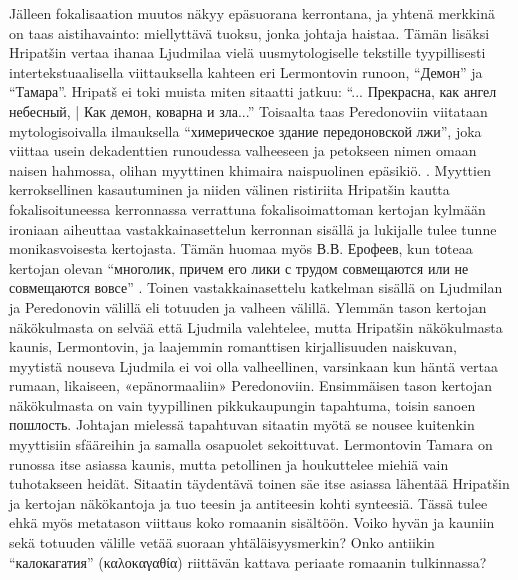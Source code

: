 \documentclass[12pt,a4paper]{article}
\begin{document}
Jälleen fokalisaation muutos näkyy epäsuorana kerrontana, ja yhtenä merkkinä on taas aistihavainto: miellyttävä tuoksu, jonka johtaja haistaa. %
Tämän lisäksi Hripatšin vertaa ihanaa Ljudmilaa vielä uusmytologiselle tekstille tyypillisesti intertekstuaalisella viittauksella kahteen eri Lermontovin runoon, \enquote{Демон} ja \enquote{Тамара}. Hripatš ei toki muista miten sitaatti jatkuu: \enquote{... Прекрасна, как ангел небесный, | Как демон, коварна и зла...} Toisaalta taas Peredonoviin viitataan mytologisoivalla ilmauksella \enquote{химерическое здание передоновской лжи}, joka viittaa usein dekadenttien runoudessa valheeseen ja petokseen nimen omaan naisen hahmossa, olihan myyttinen khimaira naispuolinen epäsikiö. \parencite[200]{hansen-love1999}. Myyttien kerroksellinen kasautuminen ja niiden välinen ristiriita Hripatšin kautta fokalisoituneessa kerronnassa verrattuna fokalisoimattoman kertojan kylmään ironiaan aiheuttaa vastakkainasettelun kerronnan sisällä ja lukijalle tulee tunne monikasvoisesta kertojasta. Tämän huomaa myös В.В. Ерофеев, kun tоteaa kertojan olevan \enquote{многолик, причем его лики с трудом совмещаются или не совмещаются вовсе} \parencite[157]{jerofeev1985}. Toinen vastakkainasettelu katkelman sisällä on Ljudmilan ja Peredonovin välillä eli totuuden ja valheen välillä. Ylemmän tason kertojan näkökulmasta on selvää että Ljudmila valehtelee, mutta Hripatšin näkökulmasta kaunis, Lermontovin, ja laajemmin romanttisen kirjallisuuden naiskuvan, myytistä nouseva Ljudmila ei voi olla valheellinen, varsinkaan kun häntä vertaa rumaan, likaiseen, «epänormaaliin» Peredonoviin. Ensimmäisen tason kertojan näkökulmasta on vain tyypillinen pikkukaupungin tapahtuma, toisin sanoen пошлость. Johtajan mielessä tapahtuvan sitaatin myötä se nousee kuitenkin myyttisiin sfääreihin ja samalla osapuolet sekoittuvat. Lermontovin Tamara on runossa itse asiassa kaunis, mutta petollinen ja houkuttelee miehiä vain tuhotakseen heidät. Sitaatin täydentävä toinen säe itse asiassa lähentää Hripatšin ja kertojan näkökantoja ja tuo teesin ja antiteesin kohti synteesiä. Tässä tulee ehkä myös metatason viittaus koko romaanin sisältöön. Voiko hyvän ja kauniin sekä totuuden välille vetää suoraan yhtäläisyysmerkin? Onko antiikin \enquote{калокагатия} (\foreignlanguage{greek}{καλοκαγαθία}) riittävän kattava periaate romaanin tulkinnassa?
% 
\end{document}
